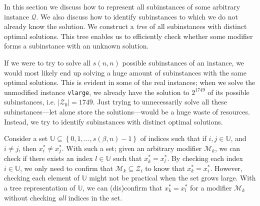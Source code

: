 In this section we discuss how to represent all subinstances of some arbitrary
instance $\mathcal{Q}$. We also discuss how to identify 
subinstances to which we do not already know the solution.
We construct a \emph{tree} of all subinstances with distinct optimal solutions.
This tree enables us to efficiently check whether some modifier forms a
subinstance with an unknown solution.

If we were to try to solve all $s(n, n)$ possible subinstances of an
instance, we would most likely end up solving a huge amount of subinstances
with the same optimal solutions. This is evident in some of the real
instances; when we solve the unmodified instance \texttt{vlarge},
we already have the solution to $2^{1749}$ of its possible subinstances, i.e.
$|\mathcal{Z}_0| = 1749$.
Just trying to unnecessarily solve all these subinstances---let alone store the
solutions---would be a huge waste of resources.
Instead, we try to identify subinstances with distinct optimal solutions.
\begin{comment}
A good starting point is to find all the subsets of $\mathcal{N}_0$ and
use them as modifiers of $Q$. This is equivalent to forcing non-zero
variables in the optimal solution of the unchanged instance $Q$, to zero.
Recall from the previous section that if $\mathcal{Q}$ is known, knowing the
modifier $\mathcal{M}_k$ is sufficient to identify the subinstance
$\mathcal{Q}_k$.
While modifiers $\mathcal{M}_k$ such that
$\mathcal{M}_k \subseteq \mathcal{N}_0$ ensures that $x_k^*\neq x_0^*$,
it does not assure us that $x_k^* \neq x_l^*$ for all $l=1,2,\ldots,s-1$.
To make sure that we only solve subinstances with distinct optimal solutions,
we need to identify modifiers $\mathcal{M}_k$ such that
$\mathcal{M}_k \not \subset \mathcal{Z}_l$
for \emph{all} $l=1,2,\ldots,s-1$.
\end{comment}

Consider a set $\mathbb{U}\subseteq \left\{{0,1,\ldots,s(\beta, n)-1}\right\}$ of indices
such that if $i,j \in \mathbb{U}$, and $i \neq j$, then $x_i^* \neq x_j^*$.
With such a set; given an arbitrary modifier $\mathcal{M}_k$, we can check
if there exists an index $l \in \mathbb{U}$ such that $x_k^* = x_l^*$. By
checking each index $i \in \mathbb{U}$, we only need to confirm that
$\mathcal{M}_k \subseteq \mathcal{Z}_i$ to know that $x_k^* = x_i^*$. However,
checking each element of $\mathbb{U}$ might not be practical when the set
grows large. With a tree representation of $\mathbb{U}$, we can (dis)confirm
that $x_k^* = x_l^*$ for a modifier $\mathcal{M}_k$ without checking \emph{all}
indices in the set.

